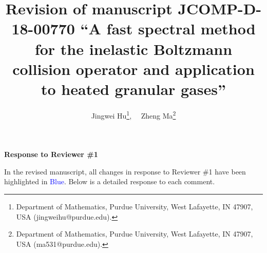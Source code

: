 \documentclass[11pt]{article}
\begin{document}
\title{Revision of manuscript JCOMP-D-18-00770  ``A fast spectral method for the inelastic Boltzmann collision operator and application to heated granular gases''}
\author{Jingwei Hu\footnote{Department of Mathematics, Purdue University, West Lafayette, IN 47907, USA (jingweihu@purdue.edu).}, \  \  
	    Zheng Ma\footnote{Department of Mathematics, Purdue University, West Lafayette, IN 47907, USA (ma531@purdue.edu).}
           }      
	\maketitle


\vspace{0.3in}
\centerline{{\large \bf{Response to Reviewer \#1}}}
\bigskip

In the revised manuscript, all changes in response to Reviewer \#1 have been highlighted in \textcolor{blue}{Blue}. Below is a detailed response to each comment.
\end{document}

